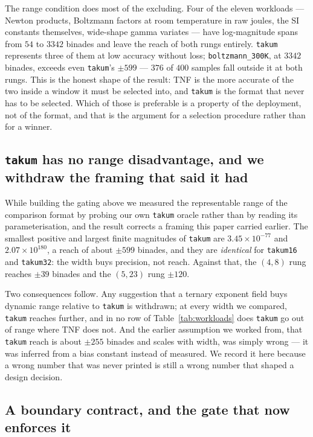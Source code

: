 \documentclass[11pt]{article}
\theoremstyle{definition}
\begin{document}
The range condition does most of the excluding. Four of the eleven workloads ---
Newton products, Boltzmann factors at room temperature in raw joules, the SI
constants themselves, wide-shape gamma variates --- have log-magnitude spans from
$54$ to $3342$ binades and leave the reach of both rungs entirely.
\texttt{takum} represents three of them at low accuracy without loss;
\texttt{boltzmann\_300K}, at $3342$ binades, exceeds even \texttt{takum}'s
$\pm 599$ --- $376$ of $400$ samples fall outside it at both rungs. This is
the honest shape of the result: TNF is the more accurate of the two inside a
window it must be selected into, and \texttt{takum} is the format that never has
to be selected. Which of those is preferable is a property of the deployment, not
of the format, and that is the argument for a selection procedure rather than for
a winner.

\subsection{\texttt{takum} has no range disadvantage, and we withdraw the framing that said it had}
\label{sec:takumrange}

While building the gating above we measured the representable range of the
comparison format by probing our own \texttt{takum} oracle rather than by reading
its parameterisation, and the result corrects a framing this paper carried
earlier. The smallest positive and largest finite magnitudes of \texttt{takum} are
$3.45 \times 10^{-77}$ and $2.07 \times 10^{180}$, a reach of about $\pm 599$
binades, and they are \emph{identical} for \texttt{takum16} and \texttt{takum32}:
the width buys precision, not reach. Against that, the $(4,8)$ rung reaches
$\pm 39$ binades and the $(5,23)$ rung $\pm 120$.

Two consequences follow. Any suggestion that a ternary exponent field buys
dynamic range relative to \texttt{takum} is withdrawn; at every width we compared,
\texttt{takum} reaches further, and in no row of Table~\ref{tab:workloads} does
\texttt{takum} go out of range where TNF does not. And the earlier assumption we
worked from, that \texttt{takum} reach is about $\pm 255$ binades and scales with
width, was simply wrong --- it was inferred from a bias constant instead of
measured. We record it here because a wrong number that was never printed is
still a wrong number that shaped a design decision.

\subsection{A boundary contract, and the gate that now enforces it}
\label{sec:boundarygate}
\end{document}
